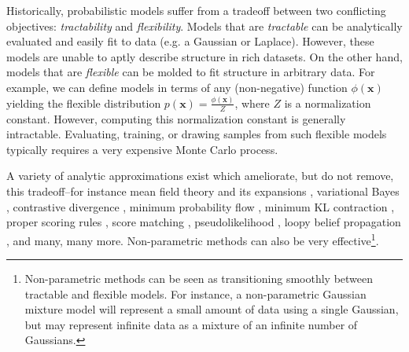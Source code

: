 \documentclass{article}
\newcommand{\mb}{\mathbf}
\begin{document}
Historically, probabilistic models suffer from a tradeoff between two conflicting objectives: \textit{tractability} and \textit{flexibility}. Models that are \textit{tractable} can be analytically evaluated and easily fit to data (e.g. a Gaussian or Laplace). However, these models are unable to aptly describe structure in rich datasets. On the other hand, models that are \textit{flexible} can be molded to fit structure in arbitrary data. For example, we can define models in terms of any (non-negative) function $\phi(\mb x)$ yielding the flexible distribution 
$p\left(\mb x\right) = \frac{\phi\left(\mb x
\right)}{Z}$, where $Z$ is a normalization constant. However, computing this normalization constant is generally intractable. Evaluating, training, or drawing samples from such flexible models typically requires a very 
expensive Monte Carlo process.

A variety of analytic approximations exist which ameliorate, but do not remove, this tradeoff--for instance mean field theory and
its  
expansions \cite{plefka,Tanaka:1998p1984}, variational Bayes \cite{jordan1999introduction}, 
contrastive divergence \cite{Welling:2002p3,Hinton02}, 
minimum probability flow \cite{MPF_ICML,SohlDickstein2011a}, minimum KL contraction \cite{mkc}, 
proper scoring rules \cite{gneiting2007strictly,parry2012proper}, 
score matching \cite{Hyvarinen05}, pseudolikelihood \cite{besag}, loopy belief propagation \cite{murphy1999loopy}, 
and many, many more.
Non-parametric methods \cite{gershman2012tutorial} 
can also be very effective\footnote{Non-parametric methods can be seen as transitioning smoothly between tractable and flexible models.  For instance, a non-parametric Gaussian mixture model will represent a small amount of data using a single Gaussian, 
but may represent infinite data as a mixture of an infinite number of Gaussians.}.
\end{document}
